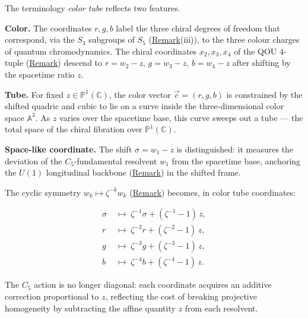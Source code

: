\begin{remark}
  \label{rem:color-tube-interpretation}
The terminology \emph{color tube} reflects two features.

\textbf{Color.}
The coordinates $r, g, b$ label the three chiral degrees of freedom
that correspond, via the $S_3$ subgroups of $S_5$
(\hyperref[rem:braid-group-action]{Remark}(iii)), to the three
colour charges of quantum chromodynamics.  The chiral coordinates
$x_2, x_3, x_4$ of the QOU $4$-tuple
(\hyperref[rem:brings-qou-4tuple]{Remark}) descend to $r = w_2 - z$,
$g = w_3 - z$, $b = w_4 - z$ after shifting by the spacetime ratio $z$.

\textbf{Tube.}
For fixed $z \in \mathbb{P}^1(\mathbb{C})$, the color vector $\vec{c} = (r, g, b)$
is constrained by the shifted quadric and
cubic to lie on a curve inside the
three-dimensional color space $\mathbb{A}^3$.  As $z$ varies over the
spacetime base, this curve sweeps out a tube --- the total space of
the chiral fibration over $\mathbb{P}^1(\mathbb{C})$.

\textbf{Space-like coordinate.}
The shift $\sigma = w_1 - z$ is distinguished: it measures the deviation
of the $C_5$-fundamental resolvent $w_1$ from the spacetime base,
anchoring the $U(1)$ longitudinal backbone
(\hyperref[rem:spectral-dynamics]{Remark}) in the shifted frame.
\end{remark}

\begin{remark}
  \label{rem:c5-color-tube}
The cyclic symmetry $w_k \mapsto \zeta^{-k} w_k$
(\hyperref[rem:lagrange-resolvents]{Remark}) becomes, in color tube coordinates:

\begin{align}
  \sigma &\;\longmapsto\; \zeta^{-1}\sigma + (\zeta^{-1}-1)\,z,
    \label{eq:c5-sigma}\\[4pt]
  r &\;\longmapsto\; \zeta^{-2}r + (\zeta^{-2}-1)\,z,
    \label{eq:c5-r}\\[4pt]
  g &\;\longmapsto\; \zeta^{-3}g + (\zeta^{-3}-1)\,z,
    \label{eq:c5-g}\\[4pt]
  b &\;\longmapsto\; \zeta^{-4}b + (\zeta^{-4}-1)\,z.
    \label{eq:c5-b}
\end{align}

The $C_5$ action is no longer diagonal: each coordinate acquires an
additive correction proportional to $z$, reflecting the cost of
breaking projective homogeneity by subtracting the affine
quantity $z$ from each resolvent.
\end{remark}

